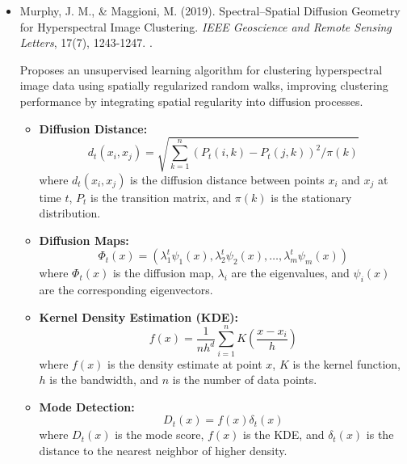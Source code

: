 \documentclass[10pt,svgnames,fragile]{beamer}
\begin{document}
\begin{frame}{}
\tiny
\begin{itemize}

\item Murphy, J. M., \& Maggioni, M. (2019). Spectral–Spatial Diffusion Geometry for Hyperspectral Image Clustering. \textit{IEEE Geoscience and Remote Sensing Letters}, 17(7), 1243-1247. \href{https://doi.org/10.1109/LGRS.2019.2943001}{\color{blue}{DOI: 10.1109/LGRS.2019.2943001}}. \cite{murphyUnsupervisedClusteringActive2018}

{\color{gray}Proposes an unsupervised learning algorithm for clustering hyperspectral image data using spatially regularized random walks, improving clustering performance by integrating spatial regularity into diffusion processes.}
\begin{itemize} \tiny
    \item \textbf{Diffusion Distance:}
    \[
    d_t(x_i, x_j) = \sqrt{\sum_{k=1}^{n} \left( P_t(i,k) - P_t(j,k) \right)^2 / \pi(k)}
    \]
    where \( d_t(x_i, x_j) \) is the diffusion distance between points \( x_i \) and \( x_j \) at time \( t \), \( P_t \) is the transition matrix, and \( \pi(k) \) is the stationary distribution.

    \item \textbf{Diffusion Maps:}
    \[
    \Phi_t(x) = \left( \lambda_1^t \psi_1(x), \lambda_2^t \psi_2(x), \ldots, \lambda_m^t \psi_m(x) \right)
    \]
    where \( \Phi_t(x) \) is the diffusion map, \( \lambda_i \) are the eigenvalues, and \( \psi_i(x) \) are the corresponding eigenvectors.

    \item \textbf{Kernel Density Estimation (KDE):}
    \[
    f(x) = \frac{1}{n h^d} \sum_{i=1}^{n} K \left( \frac{x - x_i}{h} \right)
    \]
    where \( f(x) \) is the density estimate at point \( x \), \( K \) is the kernel function, \( h \) is the bandwidth, and \( n \) is the number of data points.

    \item \textbf{Mode Detection:}
    \[
    D_t(x) = f(x) \delta_t(x)
    \]
    where \( D_t(x) \) is the mode score, \( f(x) \) is the KDE, and \( \delta_t(x) \) is the distance to the nearest neighbor of higher density.
\end{itemize}
 
\end{itemize}
\end{frame}
\end{document}
